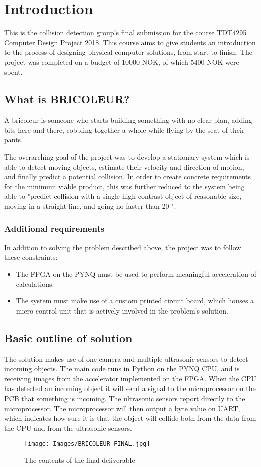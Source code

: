 

\section{Introduction}
This is the collision detection group's final submission for the course TDT4295 Computer Design Project 2018. This course aims to give students an introduction to the process of designing physical computer solutions, from start to finish. The project was completed on a budget of 10000 NOK, of which 5400 NOK were spent. 

\subsection{What is BRICOLEUR?}

A bricoleur is someone who starts building something with no clear plan, adding bits here and there, cobbling together a whole while flying by the seat of their pants. 

The overarching goal of the project was to develop a stationary system which is able to detect moving objects, estimate their velocity and direction of motion, and finally predict a potential collision. In order to create concrete requirements for the minimum viable product, this was further reduced to the system being able to "predict collision with a single high-contrast object of reasonable size, moving in a straight line, and going no faster than 20 ".

\subsubsection{Additional requirements}
In addition to solving the problem described above, the project was to follow these constraints: 
\begin{itemize}
    \item The FPGA on the PYNQ must be used to perform meaningful acceleration of calculations. 
    \item The system must make use of a custom printed circuit board, which houses a micro control unit that is actively involved in the problem's solution. 
\end{itemize}

\subsection{Basic outline of solution}
The solution makes use of one camera and multiple ultrasonic sensors to detect incoming objects. The main code runs in Python on the PYNQ CPU, and is receiving images from the accelerator implemented on the FPGA. When the CPU has detected an incoming object it will send a signal to the microprocessor on the PCB that something is incoming. The ultrasonic sensors report directly to the microprocessor. The microprocessor will then output a byte value on UART, which indicates how sure it is that the object will collide both from the data from the CPU and from the ultrasonic sensors. 

\begin{figure}
    \centering
    \texttt{[image: Images/BRICOLEUR\_FINAL.jpg]}
    \caption{The contents of the final deliverable}
    \label{fig:finito}
\end{figure}